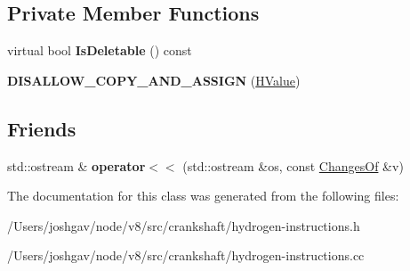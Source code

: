 \subsection*{Private Member Functions}
\begin{DoxyCompactItemize}
\item 
virtual bool {\bfseries Is\+Deletable} () const \hypertarget{classv8_1_1internal_1_1_h_value_aafa567660b0da6c31acaf057f8041704}{}\label{classv8_1_1internal_1_1_h_value_aafa567660b0da6c31acaf057f8041704}

\item 
{\bfseries D\+I\+S\+A\+L\+L\+O\+W\+\_\+\+C\+O\+P\+Y\+\_\+\+A\+N\+D\+\_\+\+A\+S\+S\+I\+GN} (\hyperlink{classv8_1_1internal_1_1_h_value}{H\+Value})\hypertarget{classv8_1_1internal_1_1_h_value_a65d56187789ee58028887d5e36d3f4d8}{}\label{classv8_1_1internal_1_1_h_value_a65d56187789ee58028887d5e36d3f4d8}

\end{DoxyCompactItemize}
\subsection*{Friends}
\begin{DoxyCompactItemize}
\item 
std\+::ostream \& {\bfseries operator$<$$<$} (std\+::ostream \&os, const \hyperlink{structv8_1_1internal_1_1_changes_of}{Changes\+Of} \&v)\hypertarget{classv8_1_1internal_1_1_h_value_adf425f274dface38eb27a3f39516b311}{}\label{classv8_1_1internal_1_1_h_value_adf425f274dface38eb27a3f39516b311}

\end{DoxyCompactItemize}


The documentation for this class was generated from the following files\+:\begin{DoxyCompactItemize}
\item 
/\+Users/joshgav/node/v8/src/crankshaft/hydrogen-\/instructions.\+h\item 
/\+Users/joshgav/node/v8/src/crankshaft/hydrogen-\/instructions.\+cc\end{DoxyCompactItemize}
